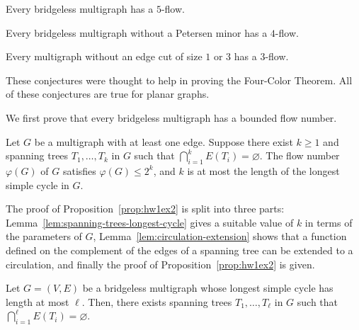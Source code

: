 \begin{conjecture}
	Every bridgeless multigraph has a \(5\)-flow.
\end{conjecture}

\begin{conjecture}
	Every bridgeless multigraph without a Petersen minor has a \(4\)-flow.	
\end{conjecture}

\begin{conjecture}
	Every multigraph without an edge cut of size \(1\) or \(3\) has a \(3\)-flow.
\end{conjecture}

These conjectures were thought to help in proving the Four-Color Theorem.
All of these conjectures are true for planar graphs.

We first prove that every bridgeless multigraph has a bounded flow number.

\begin{proposition} \label{prop:hw1ex2}
Let \(G\) be a multigraph with at least one edge.
Suppose there exist \(k \geq 1\) and spanning trees \(T_1, \ldots, T_k\) in \(G\) such that \(\bigcap_{i=1}^k E\left(T_i\right)=\varnothing\).
The flow number \(\varphi(G)\) of \(G\) satisfies \(\varphi(G) \leq 2^k\),
and \(k\) is at most the length of the longest simple cycle in \(G\).
\end{proposition}

The proof of Proposition~\ref{prop:hw1ex2} is split into three parts: Lemma~\ref{lem:spanning-trees-longest-cycle} gives a suitable value of \(k\) in terms of the parameters of \(G\),
Lemma~\ref{lem:circulation-extension} shows that a function defined on the complement of the edges of a spanning tree can be extended to a circulation,
and finally the proof of Proposition~\ref{prop:hw1ex2} is given.

\begin{lemma} \label{lem:spanning-trees-longest-cycle}
    Let \(G = (V, E)\) be a bridgeless multigraph whose longest simple cycle has length at most \(\ell\).
    Then, there exists spanning trees \(T_1, \ldots, T_\ell\) in \(G\) such that \(\bigcap_{i=1}^\ell E(T_i) = \varnothing\).
\end{lemma}

